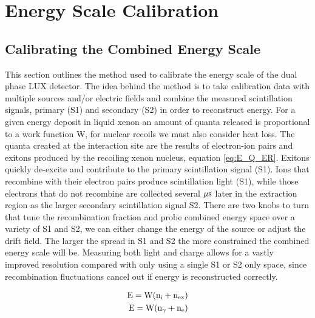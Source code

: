 \renewcommand{\thechapter}{4}

\chapter{Energy Scale Calibration}
\label{Ch:E_Scale_Cal}
\section{Calibrating the Combined Energy Scale}

This section outlines the method used to calibrate the energy scale of the dual phase LUX detector. The idea behind the method is to take calibration data with multiple sources and/or electric fields and combine the measured scintillation signals, primary (S1) and secondary (S2) in order to reconstruct energy. For a given energy deposit in liquid xenon an amount of quanta released is proportional to a work function W, for nuclear recoils we must also consider heat loss. The quanta created at the interaction site are the results of electron-ion pairs and exitons produced by the recoiling xenon nucleus, equation \ref{eq:E_Q_ER}.
Exitons quickly de-excite and contribute to the primary scintillation signal (S1). Ions that recombine with their electron pairs produce scintillation light (S1), while those electrons that do not recombine are collected several $\rm \mu s$ later in the extraction region as the larger secondary scintillation signal S2. 
There are two knobs to turn that tune the recombination fraction and probe combined energy space over a variety of S1 and S2, we can either change the energy of the source or adjust the drift field. The larger the spread in S1 and S2 the more constrained the combined energy scale will be. Measuring both light and charge allows for a vastly improved resolution compared with only using a single S1 or S2 only space, since recombination fluctuations cancel out if energy is reconstructed correctly.

\begin{equation}
\begin{split}
\rm E= W (n_i + n_{ex}) \\
\rm E= W (n_\gamma + n_e)  \\
\label{eq:E_Q_ER}
\end{split}
\end{equation}



